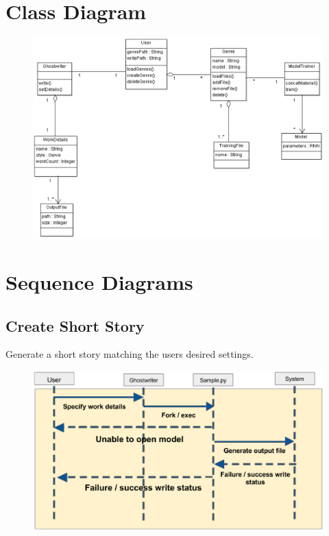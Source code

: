 \documentclass[12pt]{article}
\begin{document}
\newpage 

\section{Class Diagram}
\begin{figure}[ht]
  \centering
    \includegraphics[scale=0.7]{ClassDiagram.eps}
\end{figure}

\newpage

\section{Sequence Diagrams}

\subsection{Create Short Story}
Generate a short story matching the users desired settings.
\begin{figure}[ht]
  \centering
    \includegraphics[scale=0.5]{Case1.eps}
\end{figure}
\end{document}
